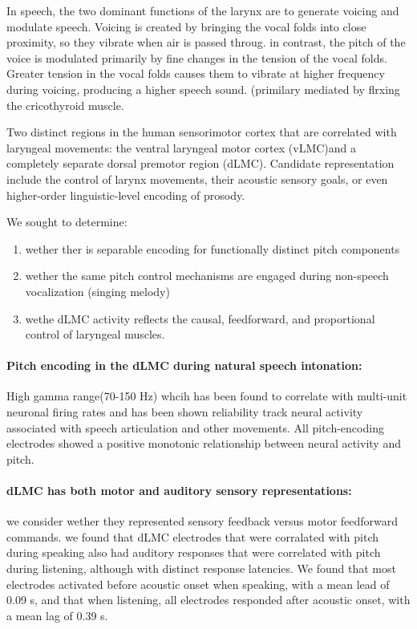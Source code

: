 \documentclass[12pt]{article}
\begin{document}
In speech, the two dominant functions of the larynx are to generate voicing and modulate speech. Voicing is created by bringing the vocal folds into close proximity, so they vibrate when air is passed throug. in contrast, the pitch of the voice is modulated primarily by fine changes in the tension of the vocal folds. Greater tension in the vocal folds causes them to vibrate at higher frequency during voicing, producing a higher speech sound. (primilary mediated by flrxing the cricothyroid muscle.

Two distinct regions in the human sensorimotor cortex that are correlated with laryngeal movements: the ventral laryngeal motor cortex (vLMC)and a completely separate dorsal premotor region (dLMC).
Candidate representation include the control of larynx movements, their acoustic sensory goals, or even higher-order linguistic-level encoding of prosody.

We sought to determine:\begin{enumerate}
\item wether ther is separable encoding for functionally distinct pitch components
\item wether the same pitch control mechanisms are engaged during non-speech vocalization (singing melody)
\item wethe dLMC activity reflects the causal, feedforward, and proportional control of laryngeal muscles.
\end{enumerate}

\paragraph{Pitch encoding in the dLMC during natural speech intonation:}
High gamma range(70-150 Hz) whcih has been found to correlate with multi-unit neuronal firing rates and has been shown reliability track neural activity associated with speech articulation and other movements.
All pitch-encoding electrodes showed a positive monotonic relationship between neural activity and pitch.

\paragraph{dLMC has both motor and auditory sensory representations:} we consider wether they represented sensory feedback versus motor feedforward commands.
we found that dLMC electrodes that were corralated with pitch during speaking also had auditory responses that were correlated with pitch during listening, although with distinct response latencies. We found that most electrodes activated before acoustic onset when speaking, with a mean lead of 0.09 s, and that when listening, all electrodes responded after acoustic onset, with a mean lag of 0.39 s.
\end{document}
